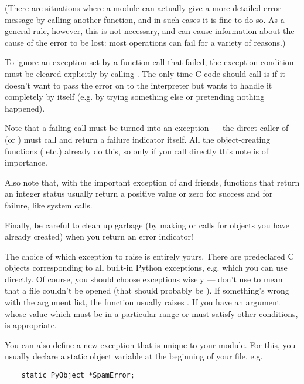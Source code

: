 (There are situations where a module can actually give a more detailed
error message by calling another  function, and in
such cases it is fine to do so.  As a general rule, however, this is
not necessary, and can cause information about the cause of the error
to be lost: most operations can fail for a variety of reasons.)

To ignore an exception set by a function call that failed, the exception
condition must be cleared explicitly by calling . 
The only time C code should call  is if it doesn't
want to pass the error on to the interpreter but wants to handle it
completely by itself (e.g. by trying something else or pretending
nothing happened).

Note that a failing  call must be turned into an
exception --- the direct caller of  (or
) must call  and return a
failure indicator itself.  All the object-creating functions
( etc.) already do this, so only if you call
 directly this note is of importance.

Also note that, with the important exception of
 and friends, functions that return an
integer status usually return a positive value or zero for success and
 for failure, like \UNIX{} system calls.

Finally, be careful to clean up garbage (by making 
or  calls for objects you have already created) when
you return an error indicator!

The choice of which exception to raise is entirely yours.  There are
predeclared C objects corresponding to all built-in Python exceptions,
e.g.  which you can use directly.  Of
course, you should choose exceptions wisely --- don't use
 to mean that a file couldn't be opened (that
should probably be ).  If something's wrong with
the argument list, the  function usually
raises .  If you have an argument whose value
which must be in a particular range or must satisfy other conditions,
 is appropriate.

You can also define a new exception that is unique to your module.
For this, you usually declare a static object variable at the
beginning of your file, e.g.

\begin{verbatim}
    static PyObject *SpamError;
\end{verbatim}

